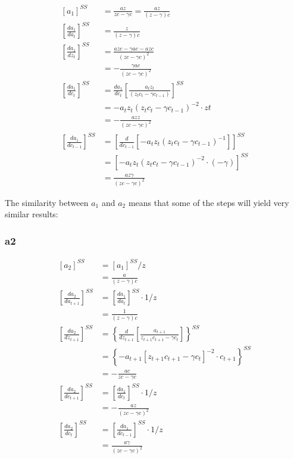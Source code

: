 \documentclass[11pt,preprint, authoryear]{elsarticle}
\numberwithin{equation}{section}
\numberwithin{figure}{section}
\numberwithin{table}{section}
\begin{document}
\[\begin{aligned}
\left[ a_{1} \right]^{SS} &=  \frac{a z}{z c -\gamma c} = \frac{a z}{(z  -\gamma)c }
\\
\left[\frac{da_{1}}{da_{t}} \right]^{SS} &= 
\frac{z}{(z  -\gamma)c}
\\
\left[\frac{da_{1}}{dz_{t}} \right]^{SS} &= 
\frac{a z c- \gamma a c-a z c}{(z c- \gamma c)^{2}}
\\
&= -\frac{ \gamma a c}{(z c- \gamma c)^{2}}
\\
\left[\frac{da_{1}}{dc_{t}} \right]^{SS} &= 
\frac{da_{1}}{dc_{t}} 
\left[ \frac{a_{t} z_{t}}{(z_t c_{t}-\gamma c_{t-1})} \right]^{SS}\\
&= -a_{t} z_t\left(z_{t} c_{t} - \gamma c_{t-1}\right)^{-2} \cdot z t\\
&= - \frac {a z z} {(z c - \gamma c)^{2}}\\
\left[\frac{da_{1}}{dc_{t-1}} \right]^{SS} &=
\left[ \frac{d}{d c_{t-1}} \left[ -a_{t} z_{t} 
\left( z_{t} c_{t} - \gamma c_{t-1} \right)^{-1} \right] \right]^{SS}\\
&= \left[ -a_{t} z_{t}\left(z_{t} c_{t}-\gamma c_{t-1}\right)^{-2}
\cdot(-\gamma) \right]^{SS}\\
&= \frac{a z \gamma}{(z c-\gamma c)^{2}}
\end{aligned}\]

The similarity between \(a_1\) and \(a_2\) means that some of the steps
will yield very similar results:

\hypertarget{a2}{%
\subsubsection{a2}\label{a2}}

\[\begin{aligned}
\left[ a_{2} \right]^{SS} &= \left[ a_{1} \right]^{SS} / z\\
&= \frac{a}{(z  -\gamma)c }\\
\left[\frac{da_{2}}{da_{t+1}} \right]^{SS} 
&= \left[\frac{da_{1}}{da_{t}} \right]^{SS} \cdot 1 / z\\
&= \frac{1}{(z  -\gamma)c}\\
\left[\frac{da_{2}}{dz_{t+1}} \right]^{SS} &= \left\{\frac{d}{d z_{t+1}}\left[\frac{a_{t+1}}{z_{t+1} c_{t+1}-\gamma c_{t}}\right]\right\}^{SS}\\
&=\left\{-a_{t+1}\left[z_{t+1} c_{t+1}-\gamma c_t\right]^{-2} \cdot c_{t+1}\right\}^{SS}\\
&= - \frac{a c}{z c-\gamma c}\\
\left[\frac{da_{2}}{dc_{t+1}} \right]^{SS} &= \left[\frac{da_{1}}{dc_{t}} \right]^{SS} \cdot 1 / z \\
&= - \frac {a z} {(z c - \gamma c)^{2}}\\\left[\frac{da_{2}}{dc_{t}} \right]^{SS} &= \left[\frac{da_{1}}{dc_{t-1}} \right]^{SS} \cdot 1 / z\\&= \frac{a \gamma}{(z c-\gamma c)^{2}}
\end{aligned}\]
\end{document}
